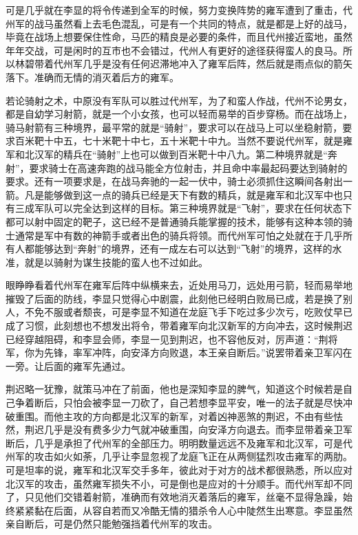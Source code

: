 可是几乎就在李显的将令传递到全军的时候，努力变换阵势的雍军遭到了重击，代州军的战马虽然看上去毛色混乱，可是有一个共同的特点，就是都是上好的战马，毕竟在战场上想要保住性命，马匹的精良是必要的条件，而且代州接近蛮地，虽然年年交战，可是闲时的互市也不会错过，代州人有更好的途径获得蛮人的良马。所以林碧带着代州军几乎是没有任何迟滞地冲入了雍军后阵，然后就是雨点似的箭矢落下。准确而无情的消灭着后方的雍军。

若论骑射之术，中原没有军队可以胜过代州军，为了和蛮人作战，代州不论男女，都是自幼学习射箭，就是一个小女孩，也可以轻而易举的百步穿杨。而在战场上，骑马射箭有三种境界，最平常的就是“骑射”，要求可以在战马上可以坐稳射箭，要求百米靶十中五，七十米靶十中七，五十米靶十中九。当然不要说代州军，就是雍军和北汉军的精兵在“骑射”上也可以做到百米靶十中八九。第二种境界就是“奔射”，要求骑士在高速奔跑的战马能全方位射击，并且命中率最起码要达到骑射的要求。还有一项要求是，在战马奔驰的一起一伏中，骑士必须抓住这瞬间各射出一箭。凡是能够做到这一点的骑兵已经是天下有数的精兵，就是雍军和北汉军中也只有三成军队可以完全达到这样的目标。第三种境界就是“飞射”，要求在任何状态下都可以射中固定的靶子，这已经不是普通骑兵能掌握的技术，能够有这种本领的骑士通常是军中有数的神箭手或者出色的骑兵将领。而代州军可怕之处就在于几乎所有人都能够达到“奔射”的境界，还有一成左右可以达到“飞射”的境界，这样的水准，就是以骑射为谋生技能的蛮人也不过如此。

眼睁睁看着代州军在雍军后阵中纵横来去，近处用马刀，远处用弓箭，轻而易举地摧毁了后面的防线，李显只觉得心中剧震，此刻他已经明白败局已成，若是换了别人，不免不服或者颓丧，可是李显不知道在龙庭飞手下吃过多少次亏，吃败仗早已成了习惯，此刻想也不想发出将令，带着雍军向北汉新军的方向冲去，这时候荆迟已经穿越阻碍，和李显会师，李显一见到荆迟，也不容他反对，厉声道：“荆将军，你为先锋，率军冲阵，向安泽方向败退，本王亲自断后。”说罢带着亲卫军闪在一旁。让后面的雍军先通过。

荆迟略一犹豫，就策马冲在了前面，他也是深知李显的脾气，知道这个时候若是自己争着断后，只怕会被李显一刀砍了，自己若想李显平安，唯一的法子就是尽快冲破重围。而他主攻的方向都是北汉军的新军，对着凶神恶煞的荆迟，不由有些怯然，荆迟几乎是没有费多少力气就冲破重围，向安泽方向退去。而李显带着亲卫军断后，几乎是承担了代州军的全部压力。明明数量远远不及雍军和北汉军，可是代州军的攻击如火如荼，几乎让李显忽视了龙庭飞正在从两侧猛烈攻击雍军的两肋。可是坦率的说，雍军和北汉军交手多年，彼此对于对方的战术都很熟悉，所以应对北汉军的攻击，虽然雍军损失不小，可是倒也是应对的十分顺手。而代州军却不同了，只见他们交错着射箭，准确而有效地消灭着落后的雍军，丝毫不显得急躁，始终紧紧黏在后面，从容自若而又冷酷无情的猎杀令人心中陡然生出寒意。李显虽然亲自断后，可是仍然只能勉强挡着代州军的攻击。

